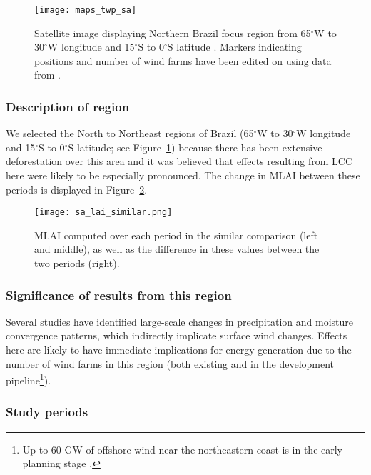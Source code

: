 \begin{figure}[!ht]
	\centering
	\texttt{[image: maps\_twp\_sa]}
	\caption[Northern Brazil Map]{Satellite image displaying Northern Brazil focus region from 65$^\circ$W to 30$^\circ$W longitude and 15$^\circ$S to 0$^\circ$S latitude \citep{maps_sa}. Markers indicating positions and number of wind farms have been edited on using data from \citep{twp_br}.}
	\label{fig:maps_twp_sa}
\end{figure}

\subsubsection{Description of region}

We selected the North to Northeast regions of Brazil (65$^\circ$W to 30$^\circ$W longitude and 15$^\circ$S to 0$^\circ$S latitude; see Figure~\ref{fig:maps_twp_sa}) because there has been extensive deforestation over this area and it was believed that effects resulting from \ac{LCC} here were likely to be especially pronounced. The change in \ac{MLAI} between these periods is displayed in Figure~\ref{fig:sa_lai_similar}.

\begin{figure}[!ht]
	\centering
	\texttt{[image: sa\_lai\_similar.png]}
	\caption[MLAI similar comparison for NB focus region]{\ac{MLAI} computed over each period in the similar comparison (left and middle), as well as the difference in these values between the two periods (right).}
	\label{fig:sa_lai_similar}
\end{figure}

\subsubsection{Significance of results from this region}

Several studies have identified large-scale changes in precipitation and moisture convergence patterns, which indirectly implicate surface wind changes. Effects here are likely to have immediate implications for energy generation due to the number of wind farms in this region (both existing and in the development pipeline\footnote{Up to 60 GW of offshore wind near the northeastern coast is in the early planning stage \citep{offshore_map}.}).

\subsubsection{Study periods}

